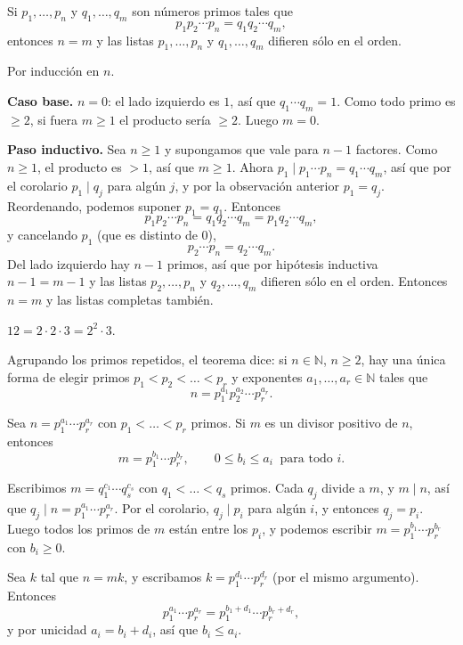\begin{proposicion}[{title={Teorema fundamental de la aritmética: unicidad}}]
Si $p_1,\dots,p_n$ y $q_1,\dots,q_m$ son números primos tales que
\[
p_1p_2\cdots p_n=q_1q_2\cdots q_m,
\]
entonces $n=m$ y las listas $p_1,\dots,p_n$ y $q_1,\dots,q_m$ difieren sólo en
el orden.
\end{proposicion}

\begin{demostracion}
Por inducción en $n$.

\textbf{Caso base.} $n=0$: el lado izquierdo es $1$, así que $q_1\cdots q_m=1$.
Como todo primo es $\ge 2$, si fuera $m\ge 1$ el producto sería $\ge 2$. Luego
$m=0$.

\textbf{Paso inductivo.} Sea $n\ge 1$ y supongamos que vale para $n-1$ factores.
Como $n\ge 1$, el producto es $>1$, así que $m\ge 1$. Ahora
$p_1\mid p_1\cdots p_n=q_1\cdots q_m$, así que por el corolario $p_1\mid q_j$
para algún $j$, y por la observación anterior $p_1=q_j$. Reordenando, podemos
suponer $p_1=q_1$. Entonces
\[
p_1p_2\cdots p_n=q_1q_2\cdots q_m=p_1q_2\cdots q_m,
\]
y cancelando $p_1$ (que es distinto de $0$),
\[
p_2\cdots p_n=q_2\cdots q_m.
\]
Del lado izquierdo hay $n-1$ primos, así que por hipótesis inductiva $n-1=m-1$
y las listas $p_2,\dots,p_n$ y $q_2,\dots,q_m$ difieren sólo en el orden.
Entonces $n=m$ y las listas completas también.
\end{demostracion}

\begin{ejemplo}
$12=2\cdot 2\cdot 3=2^2\cdot 3$.
\end{ejemplo}

\begin{nota}
Agrupando los primos repetidos, el teorema dice: si $n\in\mathbb{N}$, $n\ge 2$,
hay una única forma de elegir primos $p_1<p_2<\dots<p_r$ y exponentes
$a_1,\dots,a_r\in\mathbb{N}$ tales que
\[
n=p_1^{a_1}p_2^{a_2}\cdots p_r^{a_r}.
\]
\end{nota}

\begin{proposicion}
Sea $n=p_1^{a_1}\cdots p_r^{a_r}$ con $p_1<\dots<p_r$ primos. Si $m$ es un
divisor positivo de $n$, entonces
\[
m=p_1^{b_1}\cdots p_r^{b_r}, \qquad 0\le b_i\le a_i \ \text{ para todo } i.
\]
\end{proposicion}

\begin{demostracion}
Escribimos $m=q_1^{c_1}\cdots q_s^{c_s}$ con $q_1<\dots<q_s$ primos. Cada $q_j$
divide a $m$, y $m\mid n$, así que $q_j\mid n=p_1^{a_1}\cdots p_r^{a_r}$. Por
el corolario, $q_j\mid p_i$ para algún $i$, y entonces $q_j=p_i$. Luego todos
los primos de $m$ están entre los $p_i$, y podemos escribir
$m=p_1^{b_1}\cdots p_r^{b_r}$ con $b_i\ge 0$.

Sea $k$ tal que $n=mk$, y escribamos $k=p_1^{d_1}\cdots p_r^{d_r}$ (por el mismo
argumento). Entonces
\[
p_1^{a_1}\cdots p_r^{a_r}=p_1^{b_1+d_1}\cdots p_r^{b_r+d_r},
\]
y por unicidad $a_i=b_i+d_i$, así que $b_i\le a_i$.
\end{demostracion}